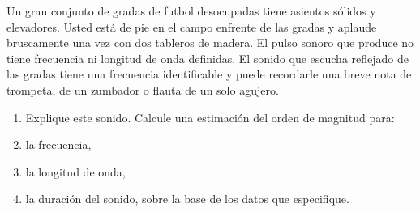 \item Un gran conjunto de gradas de futbol desocupadas tiene asientos sólidos y elevadores. Usted está de pie en el campo enfrente de las gradas y aplaude bruscamente una vez con dos tableros de madera. El pulso sonoro que produce no tiene frecuencia ni longitud de onda definidas. El sonido que escucha reflejado de las gradas tiene una frecuencia identificable y puede recordarle una breve nota de trompeta, de un zumbador o flauta de un solo agujero.
\begin{enumerate}
    \item Explique este sonido. Calcule una estimación del orden de magnitud para:
    \item la frecuencia,
    \item la longitud de onda,
    \item la duración del sonido, sobre la base de los datos que especifique.
\end{enumerate}